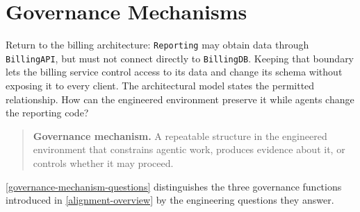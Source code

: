 


\chapter{Governance Mechanisms}


Return to the billing architecture: \texttt{Reporting} may obtain data through \texttt{BillingAPI}, but must not connect directly to \texttt{BillingDB}.
Keeping that boundary lets the billing service control access to its data and change its schema without exposing it to every client.
The architectural model states the permitted relationship.
How can the engineered environment preserve it while agents change the reporting code?


\begin{quote}
\textbf{Governance mechanism.} A repeatable structure in the engineered environment that constrains agentic work, produces evidence about it, or controls whether it may proceed.
\end{quote}

\autoref{governance-mechanism-questions} distinguishes the three governance functions introduced in \autoref{alignment-overview} by the engineering questions they answer.

